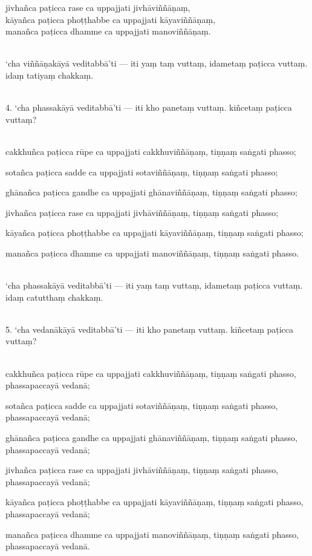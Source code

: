 \documentclass[9pt]{article}
\begin{document}
jivhañca paṭicca rase ca uppajjati jivhāviññāṇaṃ,\\

kāyañca paṭicca phoṭṭhabbe ca uppajjati kāyaviññāṇaṃ,\\

manañca paṭicca dhamme ca uppajjati manoviññāṇaṃ.\\\

‘cha viññāṇakāyā veditabbā’ti — iti yaṃ taṃ vuttaṃ, idametaṃ paṭicca vuttaṃ. idaṃ tatiyaṃ chakkaṃ.\\\

4. ‘cha phassakāyā veditabbā’ti — iti kho panetaṃ vuttaṃ. kiñcetaṃ paṭicca vuttaṃ?\\\

cakkhuñca paṭicca rūpe ca uppajjati cakkhuviññāṇaṃ, tiṇṇaṃ saṅgati phasso;\

sotañca paṭicca sadde ca uppajjati sotaviññāṇaṃ, tiṇṇaṃ saṅgati phasso;\

ghānañca paṭicca gandhe ca uppajjati ghānaviññāṇaṃ, tiṇṇaṃ saṅgati phasso;\

jivhañca paṭicca rase ca uppajjati jivhāviññāṇaṃ, tiṇṇaṃ saṅgati phasso;\

kāyañca paṭicca phoṭṭhabbe ca uppajjati kāyaviññāṇaṃ, tiṇṇaṃ saṅgati phasso;\

manañca paṭicca dhamme ca uppajjati manoviññāṇaṃ, tiṇṇaṃ saṅgati phasso.\\\

‘cha phassakāyā veditabbā’ti — iti yaṃ taṃ vuttaṃ, idametaṃ paṭicca vuttaṃ. idaṃ catutthaṃ chakkaṃ.\\\

5. ‘cha vedanākāyā veditabbā’ti — iti kho panetaṃ vuttaṃ. kiñcetaṃ paṭicca vuttaṃ?\\\

cakkhuñca paṭicca rūpe ca uppajjati cakkhuviññāṇaṃ, tiṇṇaṃ saṅgati phasso, phassapaccayā vedanā;\

sotañca paṭicca sadde ca uppajjati sotaviññāṇaṃ, tiṇṇaṃ saṅgati phasso, phassapaccayā vedanā;\

ghānañca paṭicca gandhe ca uppajjati ghānaviññāṇaṃ, tiṇṇaṃ saṅgati phasso, phassapaccayā vedanā;\

jivhañca paṭicca rase ca uppajjati jivhāviññāṇaṃ, tiṇṇaṃ saṅgati phasso, phassapaccayā vedanā;\

kāyañca paṭicca phoṭṭhabbe ca uppajjati kāyaviññāṇaṃ, tiṇṇaṃ saṅgati phasso, phassapaccayā vedanā;\

manañca paṭicca dhamme ca uppajjati manoviññāṇaṃ, tiṇṇaṃ saṅgati phasso, phassapaccayā vedanā.\\\
\end{document}
